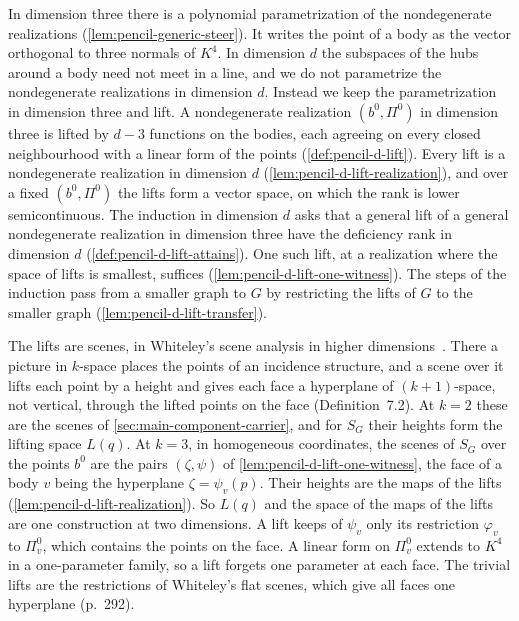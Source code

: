 In dimension three there is a polynomial parametrization of the
nondegenerate realizations (\cref{lem:pencil-generic-steer}). It writes
the point of a body as the vector orthogonal to three normals of $K^4$.
In dimension $d$ the subspaces of the hubs around a body need not meet in
a line, and we do not parametrize the nondegenerate realizations in dimension $d$.
Instead we keep the parametrization in dimension three and lift. A
nondegenerate realization $(b^0, \Pi^0)$ in dimension three is lifted by
$d - 3$ functions on the bodies, each agreeing on every closed
neighbourhood with a linear form of the points
(\cref{def:pencil-d-lift}). Every lift is a nondegenerate realization in
dimension $d$ (\cref{lem:pencil-d-lift-realization}), and over a fixed
$(b^0, \Pi^0)$ the lifts form a vector space, on which the rank is lower
semicontinuous. The induction in dimension $d$ asks that a general lift
of a general nondegenerate realization in dimension three have the
deficiency rank in dimension $d$ (\cref{def:pencil-d-lift-attains}). One
such lift, at a realization where the space of lifts is smallest,
suffices (\cref{lem:pencil-d-lift-one-witness}). The steps of the
induction pass from a smaller graph to $G$ by restricting the lifts of
$G$ to the smaller graph (\cref{lem:pencil-d-lift-transfer}).

The lifts are scenes, in Whiteley's scene analysis in higher
dimensions~\cite[\S 7.2]{whiteley1984}. There a picture in $k$-space
places the points of an incidence structure, and a scene over it lifts
each point by a height and gives each face a hyperplane of
$(k + 1)$-space, not vertical, through the lifted points on the face
(Definition~7.2). At $k = 2$ these are the scenes of
\cref{sec:main-component-carrier}, and for $S_G$ their heights form the
lifting space $L(q)$. At $k = 3$, in homogeneous coordinates, the scenes
of $S_G$ over the points $b^0$ are the pairs $(\zeta, \psi)$ of
\cref{lem:pencil-d-lift-one-witness}, the face of a body $v$ being the
hyperplane $\zeta = \psi_v(p)$. Their heights are the maps of the lifts
(\cref{lem:pencil-d-lift-realization}). So $L(q)$ and the space of the
maps of the lifts are one construction at two dimensions. A lift keeps
of $\psi_v$ only its restriction $\varphi_v$ to $\Pi^0_v$, which
contains the points on the face. A linear form on $\Pi^0_v$ extends to
$K^4$ in a one-parameter family, so a lift forgets one parameter at each
face. The trivial lifts are the restrictions of Whiteley's flat scenes,
which give all faces one hyperplane (p.~292).

